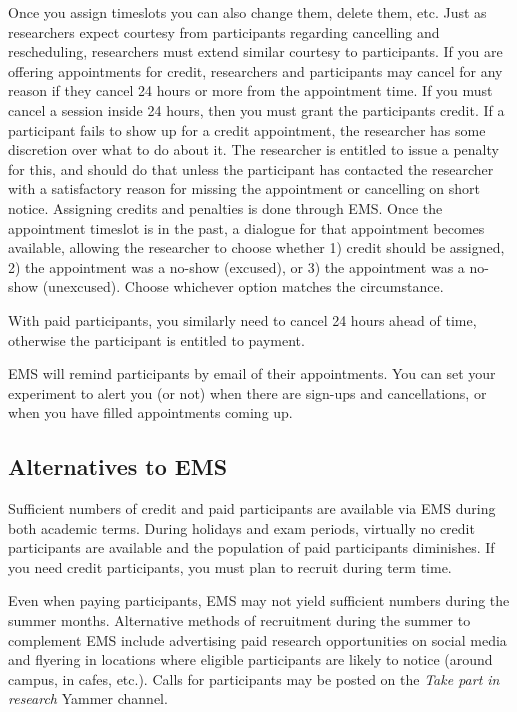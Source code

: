 \documentclass[
  12pt,
]{book}
\begin{document}
Once you assign timeslots you can also change them, delete them, etc. Just as researchers expect courtesy from participants regarding cancelling and rescheduling, researchers must extend similar courtesy to participants. If you are offering appointments for credit, researchers and participants may cancel for any reason if they cancel 24 hours or more from the appointment time. If you must cancel a session inside 24 hours, then you must grant the participants credit. If a participant fails to show up for a credit appointment, the researcher has some discretion over what to do about it. The researcher is entitled to issue a penalty for this, and should do that unless the participant has contacted the researcher with a satisfactory reason for missing the appointment or cancelling on short notice. Assigning credits and penalties is done through EMS. Once the appointment timeslot is in the past, a dialogue for that appointment becomes available, allowing the researcher to choose whether 1) credit should be assigned, 2) the appointment was a no-show (excused), or 3) the appointment was a no-show (unexcused). Choose whichever option matches the circumstance.

With paid participants, you similarly need to cancel 24 hours ahead of time, otherwise the participant is entitled to payment.

EMS will remind participants by email of their appointments. You can set your experiment to alert you (or not) when there are sign-ups and cancellations, or when you have filled appointments coming up.

\subsection{Alternatives to EMS}\label{alternatives-to-ems}

Sufficient numbers of credit and paid participants are available via EMS during both academic terms. During holidays and exam periods, virtually no credit participants are available and the population of paid participants diminishes. If you need credit participants, you must plan to recruit during term time.

Even when paying participants, EMS may not yield sufficient numbers during the summer months. Alternative methods of recruitment during the summer to complement EMS include advertising paid research opportunities on social media and flyering in locations where eligible participants are likely to notice (around campus, in cafes, etc.). Calls for participants may be posted on the \emph{Take part in research} Yammer channel.
\end{document}
